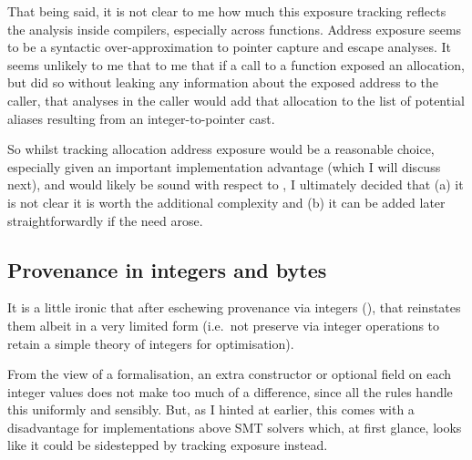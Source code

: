 That being said, it is not clear to me how much this exposure tracking reflects
the analysis inside compilers, especially across functions. Address exposure
seems to be a syntactic over-approximation to pointer capture and escape
analyses.
It seems unlikely to me that to me that if a call to a function exposed an
allocation, but did so without leaking any information about the exposed
address to the caller, that analyses in the caller would add that allocation to
the list of potential aliases resulting from an integer-to-pointer cast.

So whilst tracking allocation address exposure would be a reasonable choice,
especially given an important implementation advantage (which I will discuss
next), and would likely be sound with respect to , I ultimately
decided that (a) it is not clear it is worth the additional complexity and (b)
it can be added later straightforwardly if the need arose.

\subsection{Provenance in integers and bytes}\label{subsec:prov-int-bytes}

It is a little ironic that after eschewing provenance via integers (),
that  reinstates them albeit in a very limited form (i.e.\ not preserve
via integer operations to retain a simple theory of integers for optimisation).

From the view of a formalisation, an extra constructor or optional field on
each integer values does not make too much of a difference, since all the rules
handle this uniformly and sensibly. But, as I hinted at earlier, this comes
with a disadvantage for implementations above SMT solvers which, at first
glance, looks like it could be sidestepped by tracking exposure instead.

